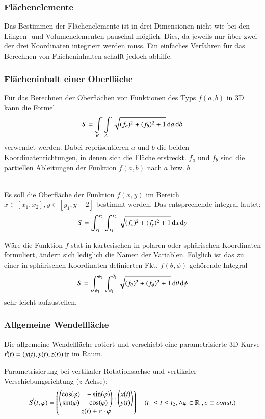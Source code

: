 \subsubsection{Flächenelemente}
Das Bestimmen der Flächenelemente ist in drei Dimensionen nicht wie bei den Längen- und Volumenelementen pauschal möglich.
Dies, da jeweils nur über zwei der drei Koordinaten integriert werden muss.
Ein einfaches Verfahren für das Berechnen von Flächeninhalten schafft jedoch abhilfe.
\subsubsection{Flächeninhalt einer Oberfläche}
Für das Berechnen der Oberflächen von Funktionen des Typs $f(a, b)$ in 3D kann die Formel
$$ S = \int\limits_{B} \int\limits_{A} \sqrt{(f_{a})^2 + (f_{b})^2 + 1} \mathop{} \! \mathrm{d} a \mathop{} \! \mathrm{d} b $$
verwendet werden. Dabei repräsentieren $a$ und $b$ die beiden Koordinatenrichtungen, in denen sich die Fläche erstreckt.
$f_a$ und $f_b$ sind die partiellen Ableitungen der Funktion $f(a, b)$ nach $a$ bzw. $b$.
\medskip

\\
Es soll die Oberfläche der Funktion $ f(x, y) $ im Bereich $ x \in [x_1, x_2], y \in [y_1, y-2] $ bestimmt werden.
Das entsprechende integral lautet:
$$ S = \int_{y_1}^{y_2} \int_{x_1}^{x_2} \sqrt{(f_{x})^2 + (f_{y})^2 + 1} \mathop{} \! \mathrm{d} x \mathop{} \! \mathrm{d} y $$

Wäre die Funktion $f$ stat in kartesischen in polaren oder sphärischen Koordinaten formuliert, ändern sich lediglich die Namen der Variablen. 
Folglich ist das zu einer in sphärischen Koordinaten definierten Fkt. $f(\theta, \phi)$ gehörende Integral
$$ S = \int_{\phi_1}^{\phi_2} \int_{\theta_1}^{\theta_2} \sqrt{(f_{\theta})^2 + (f_{\phi})^2 + 1} \mathop{} \! \mathrm{d} \theta \mathop{} \! \mathrm{d} \phi $$
sehr leicht aufzustellen.


\subsubsection{Allgemeine Wendelfläche}
Die allgemeine Wendelfläche rotiert und verschiebt eine parametrisierte 3D Kurve $\vec{r}(t) = (x(t), y(t), z(t))\operatorname{tr}$ im Raum.

Parametrisierung bei vertikaler Rotationsachse und vertikaler Verschiebungsrichtung ($z$-Achse):
\[
    \vec{S}(t, \varphi) = \begin{pmatrix}
        \begin{pmatrix}
            \cos(\varphi) & -\sin(\varphi)\\
            \sin(\varphi) & \cos(\varphi)
        \end{pmatrix}
        \cdot \begin{pmatrix}
            x(t)\\
            y(t)
        \end{pmatrix}\\
        z(t) + c \cdot \varphi
    \end{pmatrix}
    \quad (t_1 \leq t \leq t_2, \land \varphi \in \mathbb{R}\;, c \equiv const.)
\]

